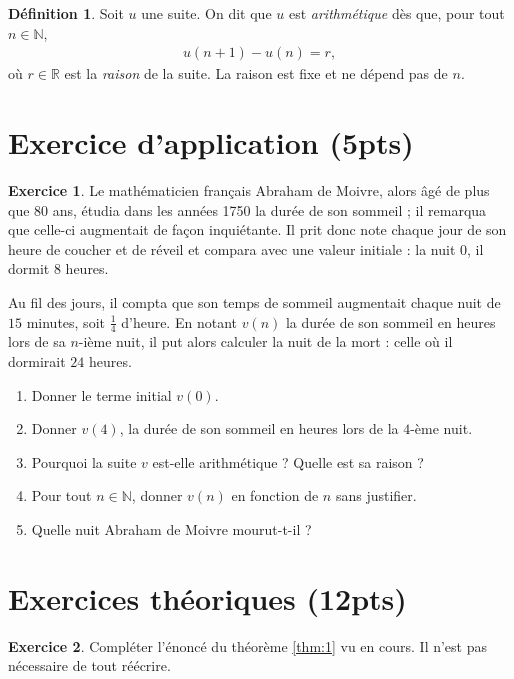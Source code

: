 \documentclass[12pt]{paper}
\theoremstyle{plain}
\theoremstyle{definition}
\newtheorem{ex}{Exercice}
\newtheorem{definition}{Définition}
\newcommand{\R}{\mathbb{R}}
\newcommand{\N}{\mathbb{N}}
\begin{document}
\pagestyle{fancy}
\fancyhead[R]{\today}

\begin{definition}\label{def:1}
	Soit $u$ une suite. On dit que $u$ est \emph{arithmétique} dès que, pour tout $n\in\N$,
		\begin{align}\label{eq:def}
			u(n+1) - u(n) = r,
		\end{align}
	où $r\in\R$ est la \emph{raison} de la suite. La raison est fixe et ne dépend pas de $n$.
\end{definition}
	

\section*{Exercice d'application (5pts)}

\begin{ex}
	Le mathématicien français Abraham de Moivre, alors âgé de plus que 80 ans, étudia dans les années 1750 la durée de son sommeil ; il remarqua que celle-ci augmentait de façon inquiétante.
	Il prit donc note chaque jour de son heure de coucher et de réveil et compara avec une valeur initiale : la nuit $0$, il dormit $8$ heures.
	
	Au fil des jours, il compta que son temps de sommeil augmentait chaque nuit de $15$ minutes, soit $\frac14$ d'heure.
	En notant $v(n)$ la durée de son sommeil en heures lors de sa $n$-ième nuit, il put alors calculer la nuit de la mort : celle où il dormirait $24$ heures.
	\begin{enumerate}
		\item Donner le terme initial $v(0)$.
		\item Donner $v(4)$, la durée de son sommeil en heures lors de la $4$-ème nuit.
		\item Pourquoi la suite $v$ est-elle arithmétique ? Quelle est sa raison ?
		\item Pour tout $n\in\N$, donner $v(n)$ en fonction de $n$ sans justifier.
		\item Quelle nuit Abraham de Moivre mourut-t-il ?
	\end{enumerate}
\end{ex}

\section*{Exercices théoriques (12pts)}

\begin{ex}
	Compléter l'énoncé du théorème \ref{thm:1} vu en cours. Il n'est pas nécessaire de tout réécrire.
\end{ex}
\end{document}
